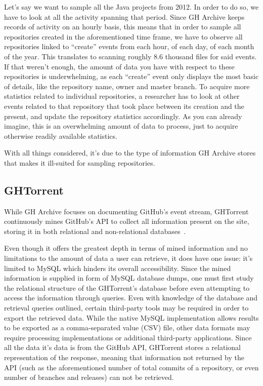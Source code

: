 Let's say we want to sample all the Java projects from 2012.
In order to do so, we have to look at all the activity spanning that period.
Since GH Archive keeps records of activity on an hourly basis, this means that in order to sample all repositories created in the aforementioned time frame, we have to observe all repositories linked to ``create'' events from each hour, of each day, of each month of the year.
This translates to scanning roughly 8.6 thousand files for said events.
If that weren't enough, the amount of data you have with respect to these repositories is underwhelming, as each ``create'' event only displays the most basic of details, like the repository name, owner and master branch.
To acquire more statistics related to individual repositories, a researcher has to look at other events related to that repository that took place between its creation and the present, and update the repository statistics accordingly.
As you can already imagine, this is an overwhelming amount of data to process, just to acquire otherwise readily available statistics.

With all things considered, it's due to the type of information GH Archive stores that makes it ill-suited for sampling repositories.

\subsection{GHTorrent}

While GH Archive focuses on documenting GitHub's event stream, GHTorrent continuously mines GitHub's API to collect all information present on the site, storing it in both relational and non-relational databases~\cite{G13}.

Even though it offers the greatest depth in terms of mined information and no limitations to the amount of data a user can retrieve, it does have one issue: it's limited to MySQL which hinders its overall accessibility.
Since the mined information is supplied in form of MySQL database dumps, one must first study the relational structure of the GHTorrent's database before even attempting to access the information through queries.
Even with knowledge of the database and retrieval queries outlined, certain third-party tools may be required in order to export the retrieved data.
While the native MySQL implementation allows results to be exported as a comma-separated value (CSV) file, other data formats may require processing implementations or additional third-party applications.
Since all the data it's data is from the GitHub API, GHTorrent stores a relational representation of the response, meaning that information not returned by the API (such as the aforementioned number of total commits of a repository, or even number of branches and releases) can not be retrieved.
